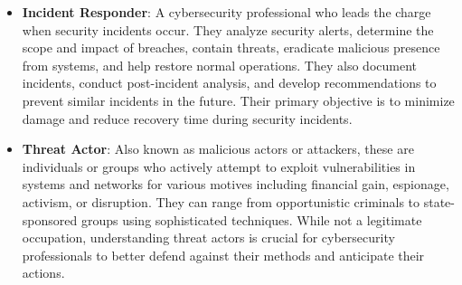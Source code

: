 \begin{itemize}
    \item \textbf{Incident Responder}: A cybersecurity professional who leads the charge when security incidents occur. They analyze security alerts, determine the scope and impact of breaches, contain threats, eradicate malicious presence from systems, and help restore normal operations. They also document incidents, conduct post-incident analysis, and develop recommendations to prevent similar incidents in the future. Their primary objective is to minimize damage and reduce recovery time during security incidents.

    \item \textbf{Threat Actor}: Also known as malicious actors or attackers, these are individuals or groups who actively attempt to exploit vulnerabilities in systems and networks for various motives including financial gain, espionage, activism, or disruption. They can range from opportunistic criminals to state-sponsored groups using sophisticated techniques. While not a legitimate occupation, understanding threat actors is crucial for cybersecurity professionals to better defend against their methods and anticipate their actions.
\end{itemize}